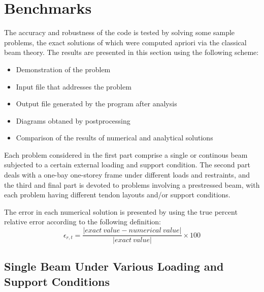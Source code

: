 \lstset{basicstyle=\ttfamily\footnotesize, columns=fullflexible, keepspaces=true}
\section{Benchmarks}
The accuracy and robustness of the code is tested by solving some sample 
problems, the exact solutions of which were computed apriori via the classical
beam theory. The results are presented in this section using the following scheme: 
\begin{itemize}
    \item Demonstration of the problem
    \item Input file that addresses the problem
    \item Output file generated by the program after analysis
    \item Diagrams obtaned by postprocessing 
    \item Comparison of the results of numerical and analytical solutions
\end{itemize}
Each problem considered in the first part comprise a single or continous beam 
subjected to  a certain external loading and support condition. The second part 
deals with a one-bay one-storey frame under different loads and restraints, 
and the third and final part is devoted to problems involving a prestressed beam,
with each problem having different tendon layouts and/or support conditions.
\par
The error in each numerical solution is presented by using the true
percent relative error according to the following definition:
\begin{equation*}
    \epsilon_{r,t} = \frac{|exact \: value - numerical \: value|}
                          {|exact \: value|} \times 100
\end{equation*}
%
%
\subsection{Single Beam Under Various Loading and Support Conditions}
%
%
